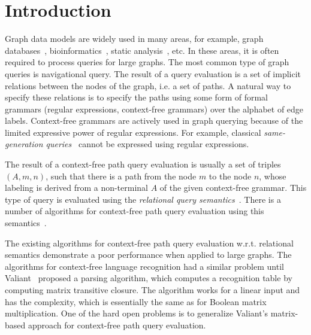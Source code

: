 \section{Introduction}

Graph data models are widely used in many areas, for example, graph databases~\cite{graphDB}, bioinformatics~\cite{Bio}, static analysis~\cite{kodumal2004set, zhang2013fast}, etc. In these areas, it is often required to process queries for large graphs. The most common type of graph queries is navigational query. The result of a query evaluation is a set of implicit relations between the nodes of the graph, i.e. a set of paths. A natural way to specify these relations is to specify the paths using some form of formal grammars (regular expressions, context-free grammars) over the alphabet of edge labels. Context-free grammars are actively used in graph querying because of the limited expressive power of regular expressions. For example, classical \emph{same-generation queries}~\cite{FndDB} cannot be expressed using regular expressions.

The result of a context-free path query evaluation is usually a set of triples \mbox{$(A, m, n)$}, such that there is a path from the node $m$ to the node $n$, whose labeling is derived from a non-terminal $A$ of the given context-free grammar. This type of query is evaluated using the \emph{relational query semantics}~\cite{hellingsRelational}. There is a number of algorithms for context-free path query evaluation using this semantics~\cite{GLL, hellingsRelational, RDF, GraphQueryWithEarley}.

The existing algorithms for context-free path query evaluation w.r.t. relational semantics demonstrate a poor performance when applied to large graphs. The algorithms for context-free language recognition had a similar problem until Valiant~\cite{valiant} proposed a parsing algorithm, which computes a recognition table by computing matrix transitive closure. The algorithm works for a linear input and has the complexity, which is essentially the same as for Boolean matrix multiplication. One of the hard open problems is to generalize Valiant's matrix-based approach for context-free path query evaluation.

